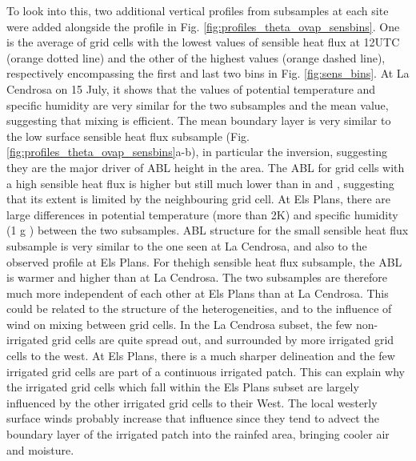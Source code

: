 To look into this, two additional vertical profiles from subsamples at each site were added alongside the \mesomean profile in Fig. \ref{fig:profiles_theta_ovap_sensbins}. One is the average of grid cells with the lowest values of sensible heat flux at 12UTC (orange dotted line) and the other of the highest values (orange dashed line), respectively encompassing the first and last two bins in Fig. \ref{fig:sens_bins}. 
At La Cendrosa on 15 July, it shows that the values of potential temperature and specific humidity are very similar for the two subsamples and the mean value, suggesting that mixing is efficient.
The mean boundary layer is very similar to the low surface sensible heat flux subsample (Fig. \ref{fig:profiles_theta_ovap_sensbins}a-b), in particular the inversion, suggesting they are the major driver of ABL height in the area. The ABL for grid cells with a high sensible heat flux is higher but still much lower than in \noirr and \irr, suggesting that its extent is limited by the neighbouring grid cell.
At Els Plans, there are large differences in potential temperature (more than 2K) and specific humidity (1 g \perkg) between the two subsamples.
ABL structure for the small sensible heat flux subsample is very similar to the one seen at La Cendrosa, and also to the observed profile at Els Plans. For thehigh sensible heat flux subsample, the ABL is warmer and higher than at La Cendrosa. 
The two subsamples are therefore much more independent of each other at Els Plans than at La Cendrosa. This could be related to the structure of the heterogeneities, and to the influence of wind on mixing between grid cells.
In the La Cendrosa subset, the few non-irrigated grid cells are quite spread out, and surrounded by more irrigated grid cells to the west. At Els Plans, there is a much sharper delineation and the few irrigated grid cells are part of a continuous irrigated patch. This can explain why the irrigated grid cells which fall within the Els Plans subset are largely influenced by the other irrigated grid cells to their West. 
The local westerly surface winds probably increase that influence since they tend to advect the boundary layer of the irrigated patch into the rainfed area, bringing cooler air and moisture.%

